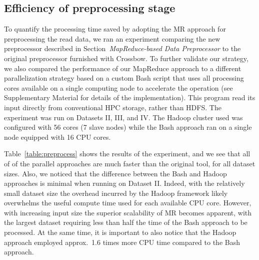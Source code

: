 \documentclass{bioinfo}
\begin{document}
\subsection*{Efficiency of preprocessing stage}

To quantify the processing time saved by adopting the MR approach for
preprocessing the read data, we ran an
experiment comparing the new preprocessor described in
Section~{\it MapReduce-based Data Preprocessor} to the original preprocessor furnished with
Crossbow. To further validate our strategy, we also compared the performance of
our MapReduce approach to a different parallelization strategy based on a custom Bash script
that uses all processing cores available on a single computing node to accelerate the operation (see Supplementary Material for details of the implementation). This program read its
input directly from conventional HPC storage, rather than HDFS\@.  The experiment
was run on Datasets II, III, and IV\@.  The Hadoop cluster used was configured
with 56 cores (7 slave nodes) while the Bash approach ran on a single node
equipped with 16 CPU cores.



Table~\ref{table:preprocess} shows the results of the experiment, and we see that all 
of of the parallel approaches are much faster than the original tool, for
all dataset sizes.  Also, we noticed that the difference between the Bash and Hadoop
approaches is minimal when running on Dataset II\@.  Indeed, with the relatively
small dataset size the overhead incurred by the Hadoop framework likely
overwhelms the useful compute time used for each available CPU core. However,
with increasing input size the superior scalability of MR becomes apparent, with
the largest dataset requiring less than half the time of the Bash
approach to be processed. At the same time, it is important to also notice that
the Hadoop approach employed approx.\ 1.6 times more CPU time compared to the
Bash approach.
\end{document}
